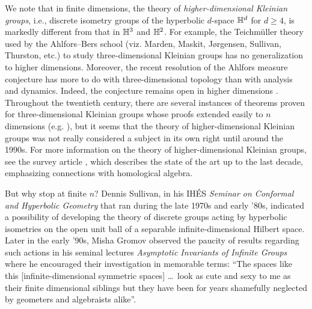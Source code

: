 We note that in finite dimensions, the theory of \emph{higher-dimensional Kleinian groups}, i.e., discrete isometry groups of the hyperbolic $d$-space $\H^d$ for $d \geq 4$, is markedly different from that in $\H^3$ and $\H^2$. For example, the Teichm\"uller theory used by the Ahlfors--Bers school (viz. Marden, Maskit, J\o rgensen, Sullivan, Thurston, etc.) to study three-dimensional Kleinian groups has no generalization to higher dimensions. Moreover, the recent resolution of the Ahlfors measure conjecture \cite{Agol,CalegariGabai} has more to do with three-dimensional topology than with analysis and dynamics. Indeed, the conjecture remains open in higher dimensions \cite[p. 526, last paragraph]{Kapovich}. Throughout the twentieth century, there are several instances of theorems proven for three-dimensional Kleinian groups whose proofs extended easily to $n$ dimensions (e.g. \cite{BeardonMaskit,Mostow}), but it seems that the theory of higher-dimensional Kleinian groups was not really considered a subject in its own right until around the 1990s. For more information on the theory of higher-dimensional Kleinian groups, see the survey article \cite{Kapovich}, which describes the state of the art up to the last decade, emphasizing connections with homological algebra.

But why stop at finite $n$? Dennis Sullivan, in his IH\'ES \emph{Seminar on Conformal and Hyperbolic Geometry} \cite{Sullivan_seminar} that ran during the late 1970s and early '80s, indicated a possibility of developing the theory of discrete groups acting by hyperbolic isometries on the open unit ball of a separable infinite-dimensional Hilbert space. Later in the early '90s, Misha Gromov observed the paucity of results regarding such actions in his seminal lectures \emph{Asymptotic Invariants of Infinite Groups} \cite{Gromov4} where he encouraged their investigation in memorable terms:
``The spaces like this [infinite-dimensional symmetric spaces] \ldots ~look as cute and sexy to me as their finite dimensional siblings but they have been for years shamefully neglected by geometers and algebraists alike''.

